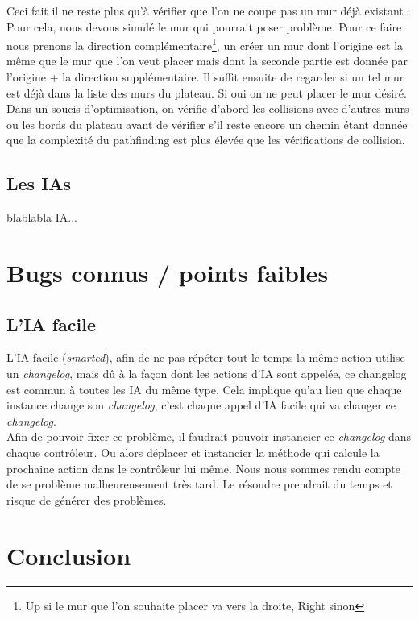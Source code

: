 \documentclass[a4paper, 12pt]{article}
\begin{document}
Ceci fait il ne reste plus qu'à vérifier que l'on ne coupe pas un mur déjà existant : \\
Pour cela, nous devons simulé le mur qui pourrait poser problème. Pour ce faire nous prenons la direction complémentaire\footnote{Up si le mur que l'on souhaite placer va vers la droite, Right sinon}, un créer un mur dont l'origine est la même que le mur que l'on veut placer mais dont la seconde partie est donnée par l'origine + la direction supplémentaire. Il suffit ensuite de regarder si un tel mur est déjà dans la liste des murs du plateau. Si oui on ne peut placer le mur désiré. \\
Dans un soucis d'optimisation, on vérifie d'abord les collisions avec d'autres murs ou les bords du plateau avant de vérifier s'il reste encore un chemin étant donnée que la complexité du pathfinding est plus élevée que les vérifications de collision.

\subsection{Les IAs}
blablabla IA...
\section{Bugs connus / points faibles}

\subsection{L'IA facile}
L'IA facile (\textit{smarted}), afin de ne pas répéter tout le temps la même action utilise un \textit{changelog}, mais dû à la façon dont les actions d'IA sont appelée, ce changelog est commun à toutes les IA du même type. Cela implique qu'au lieu que chaque instance change son \textit{changelog}, c'est chaque appel d'IA facile qui va changer ce \textit{changelog}. \\
Afin de pouvoir fixer ce problème, il faudrait pouvoir instancier ce \textit{changelog} dans chaque contrôleur. Ou alors déplacer et instancier la méthode qui calcule la prochaine action dans le contrôleur lui même. Nous nous sommes rendu compte de se problème malheureusement très tard. Le résoudre prendrait du temps et risque de générer des problèmes.

\section{Conclusion}
\end{document}
